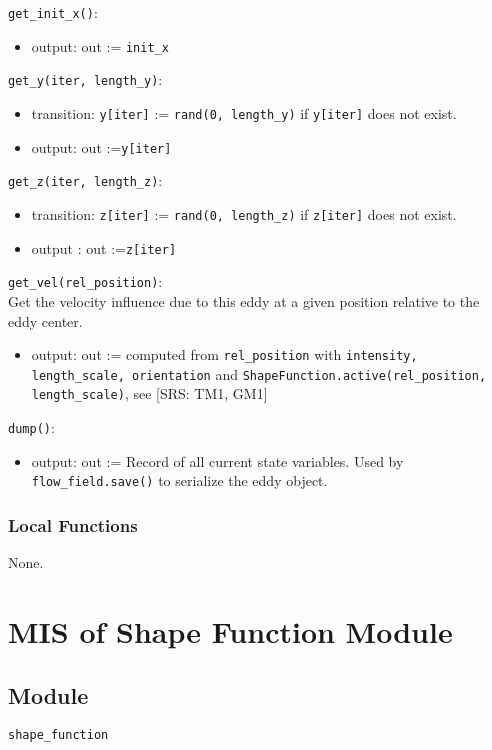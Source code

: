 \documentclass[12pt, titlepage]{article}
\begin{document}
\noindent \texttt{get\_init\_x()}:
\begin{itemize}
  \item output: out := \texttt{init\_x}
\end{itemize}

\noindent \texttt{get\_y(iter, length\_y)}:
\begin{itemize}
  \item transition: \texttt{y[iter]} := \texttt{rand(0, length\_y)} if \texttt{y[iter]} does not exist.
  \item output: out :=\texttt{y[iter]}
\end{itemize}

\noindent \texttt{get\_z(iter, length\_z)}:
\begin{itemize}
  \item transition: \texttt{z[iter]} := \texttt{rand(0, length\_z)} if \texttt{z[iter]} does not exist.
  \item output
  : out :=\texttt{z[iter]}
\end{itemize}
\noindent \texttt{get\_vel(rel\_position)}:\\
Get the velocity influence due to this eddy at a given position relative to the eddy center.
\begin{itemize}
  \item output: out := computed from \texttt{rel\_position} with \texttt{intensity, length\_scale, orientation} and \texttt{ShapeFunction.active(rel\_position, length\_scale)}, see [SRS: TM1, GM1]
\end{itemize}

\noindent \texttt{dump()}:
\begin{itemize}
\item output: out := Record of all current state variables. Used by \texttt{flow\_field.save()} to serialize the eddy object.
\end{itemize}

\subsubsection{Local Functions}

None.


\newpage
\section{MIS of Shape Function Module} \label{mShape}

\subsection{Module}
\texttt{shape\_function}
\end{document}

